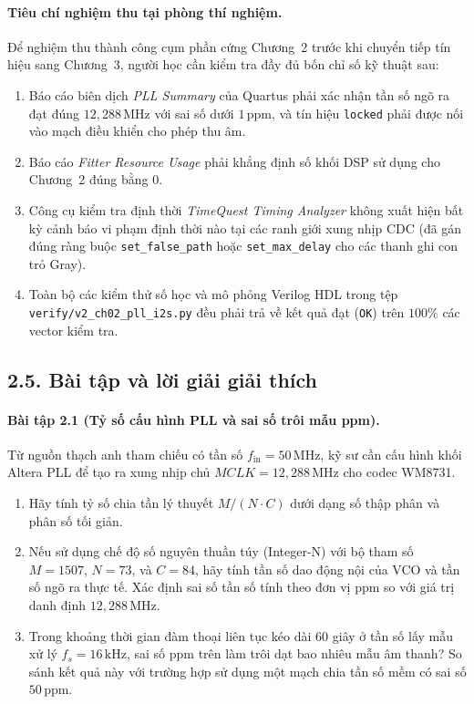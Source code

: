 \paragraph{Tiêu chí nghiệm thu tại phòng thí nghiệm.}
Để nghiệm thu thành công cụm phần cứng Chương~2 trước khi chuyển tiếp tín hiệu sang Chương~3, người học cần kiểm tra đầy đủ bốn chỉ số kỹ thuật sau:
\begin{enumerate}
    \item Báo cáo biên dịch \emph{PLL Summary} của Quartus phải xác nhận tần số ngõ ra đạt đúng $12{,}288\,\text{MHz}$ với sai số dưới $1\,\text{ppm}$, và tín hiệu \texttt{locked} phải được nối vào mạch điều khiển cho phép thu âm.
    \item Báo cáo \emph{Fitter Resource Usage} phải khẳng định số khối DSP sử dụng cho Chương~2 đúng bằng 0.
    \item Công cụ kiểm tra định thời \emph{TimeQuest Timing Analyzer} không xuất hiện bất kỳ cảnh báo vi phạm định thời nào tại các ranh giới xung nhịp CDC (đã gán đúng ràng buộc \texttt{set\_false\_path} hoặc \texttt{set\_max\_delay} cho các thanh ghi con trỏ Gray).
    \item Toàn bộ các kiểm thử số học và mô phỏng Verilog HDL trong tệp \texttt{verify/v2\_ch02\_pll\_i2s.py} đều phải trả về kết quả đạt (\texttt{OK}) trên $100\%$ các vector kiểm tra.
\end{enumerate}

\subsection*{2.5. Bài tập và lời giải giải thích}

\paragraph{Bài tập 2.1 (Tỷ số cấu hình PLL và sai số trôi mẫu ppm).}
Từ nguồn thạch anh tham chiếu có tần số $f_{\mathrm{in}} = 50\,\text{MHz}$, kỹ sư cần cấu hình khối Altera PLL để tạo ra xung nhịp chủ $MCLK = 12{,}288\,\text{MHz}$ cho codec WM8731.
\begin{enumerate}[label=\alph*)]
    \item Hãy tính tỷ số chia tần lý thuyết $M / (N \cdot C)$ dưới dạng số thập phân và phân số tối giản.
    \item Nếu sử dụng chế độ số nguyên thuần túy (Integer-N) với bộ tham số $M = 1507$, $N = 73$, và $C = 84$, hãy tính tần số dao động nội của VCO và tần số ngõ ra thực tế. Xác định sai số tần số tính theo đơn vị ppm so với giá trị danh định $12{,}288\,\text{MHz}$.
    \item Trong khoảng thời gian đàm thoại liên tục kéo dài 60 giây ở tần số lấy mẫu xử lý $f_s = 16\,\text{kHz}$, sai số ppm trên làm trôi dạt bao nhiêu mẫu âm thanh? So sánh kết quả này với trường hợp sử dụng một mạch chia tần số mềm có sai số $50\,\text{ppm}$.
\end{enumerate}

